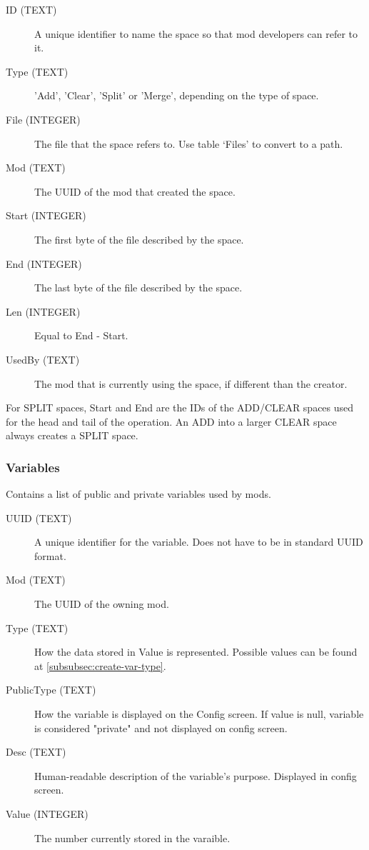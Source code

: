 \begin{description}
\item[ID (TEXT)] A unique identifier to name the space so that mod developers can refer to it.
\item[Type (TEXT)] 'Add', 'Clear', 'Split' or 'Merge', depending on the type of space.
\item[File (INTEGER)] The file that the space refers to. Use table `Files' to convert to a path.
\item[Mod (TEXT)] The UUID of the mod that created the space.
\item[Start (INTEGER)] The first byte of the file described by the space.
\item[End (INTEGER)] The last byte of the file described by the space.
\item[Len (INTEGER)] Equal to End - Start.
\item[UsedBy (TEXT)] The mod that is currently using the space, if different than the creator.
\end{description}

For SPLIT spaces, Start and End are the IDs of the ADD/CLEAR spaces used for the head and tail of the operation.
An ADD into a larger CLEAR space always creates a SPLIT space.

\subsubsection{Variables}
Contains a list of public and private variables used by mods.

\begin{description}
\item[UUID (TEXT)] A unique identifier for the variable. Does not have to be in standard UUID format.
\item[Mod (TEXT)] The UUID of the owning mod.
\item[Type (TEXT)] How the data stored in Value is represented. Possible values can be found at \ref{subsubsec:create-var-type}.
\item[PublicType (TEXT)] How the variable is displayed on the Config screen. If value is null, variable is considered "private" and not displayed on config screen. 
\item[Desc (TEXT)] Human-readable description of the variable's purpose. Displayed in config screen.	
\item[Value (INTEGER)] The number currently stored in the varaible.

\end{description}

